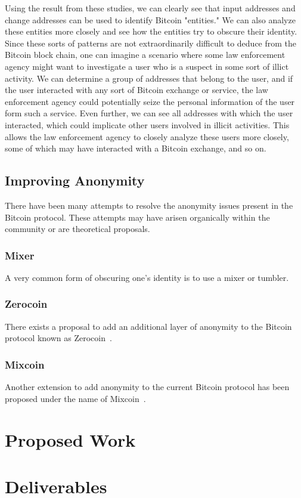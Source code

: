 \documentclass[11pt]{article}
\begin{document}
Using the result from these studies, we can clearly see that input addresses and
change addresses can be used to identify Bitcoin "entities." We can also analyze
these entities more closely and see how the entities try to obscure their
identity. Since these sorts of patterns are not extraordinarily difficult to
deduce from the Bitcoin block chain, one can imagine a scenario where some law
enforcement agency might want to investigate a user who is a suspect in some
sort of illict activity. We can determine a group of addresses that belong to
the user, and if the user interacted with any sort of Bitcoin exchange or
service, the law enforcement agency could potentially seize the personal
information of the user form such a service. Even further, we can see all
addresses with which the user interacted, which could implicate other users
involved in illicit activities. This allows the law enforcement agency to
closely analyze these users more closely, some of which may have interacted with
a Bitcoin exchange, and so on.

\subsection{Improving Anonymity}
There have been many attempts to resolve the anonymity issues present in the
Bitcoin protocol. These attempts may have arisen organically within the
community or are theoretical proposals.
\subsubsection{Mixer}
A very common form of obscuring one's identity is to use a mixer or tumbler.
\subsubsection{Zerocoin}
There exists a proposal to add an additional layer of anonymity to the Bitcoin
protocol known as Zerocoin~\cite{miers13}.
\subsubsection{Mixcoin}
Another extension to add anonymity to the current Bitcoin protocol has been
proposed under the name of Mixcoin~\cite{bonneau14}.

\section{Proposed Work}

\section{Deliverables}


\end{document}
